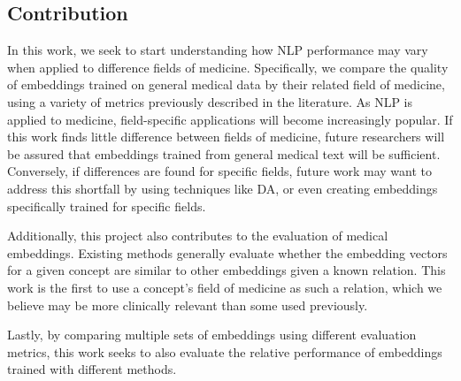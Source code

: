 \documentclass[10pt]{article}
\begin{document}
\subsection{Contribution}



In this work, we seek to start understanding how NLP performance may vary when applied to difference fields of medicine. Specifically, we compare the quality of embeddings trained on general medical data by their related field of medicine, using a variety of metrics previously described in the literature. As NLP is applied to medicine, field-specific applications will become increasingly popular. If this work finds little difference between fields of medicine, future researchers will be assured that embeddings trained from general medical text will be sufficient. Conversely, if differences are found for specific fields, future work may want to address this shortfall by using techniques like DA, or even creating embeddings specifically trained for specific fields. 

Additionally, this project also contributes to the evaluation of medical embeddings. Existing methods generally evaluate whether the embedding vectors for a given concept are similar to other embeddings given a known relation. This work is the first to use a concept's field of medicine as such a relation, which we believe may be more clinically relevant than some used previously. 

Lastly, by comparing multiple sets of embeddings using different evaluation metrics, this work seeks to also evaluate the relative performance of embeddings trained with different methods. 

\end{document}
